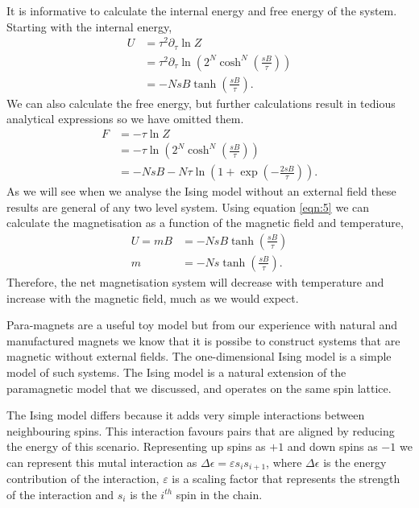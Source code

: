 \documentclass[a4paper, twocolumn]{article}
\begin{document}
It is informative to calculate the internal energy and free %
energy of the system. Starting with the internal energy,
%
\begin{align}
U &= \tau^{2}\partial_{\tau}\ln Z\nonumber\\
    &= \tau^{2}\partial_{\tau}\ln\left(2^{N}\cosh^{N}
        \left(\frac{sB}{\tau}\right)\right)\nonumber\\
    &= -NsB\tanh\left(\frac{sB}{\tau}\right).
\label{eqn:5}
\end{align}
%
We can also calculate the free energy, but further calculations %
result in tedious analytical expressions so we have omitted them. %
%
\begin{align}
F &= -\tau\ln Z\nonumber\\
    &= -\tau\ln\left(2^{N}\cosh^{N}\left(\frac{sB}{\tau}
        \right)\right)\nonumber\\
    &= -NsB - N\tau\ln\left(1 + \exp\left(-\frac{2sB}{\tau}\right)
        \right).
\label{eqn:7}
\end{align}
%
As we will see when we analyse the Ising model without an external %
field these results are general of any two level system. Using %
equation \ref{eqn:5} we can calculate the magnetisation as a function %
of the magnetic field and temperature, 
%
\begin{align}
U = mB &= -NsB\tanh\left(\frac{sB}{\tau}\right)\nonumber\\
    m &= -Ns\tanh\left(\frac{sB}{\tau}\right).
\label{eqn:8}
\end{align}
%
Therefore, the net magnetisation system will decrease with %
temperature and increase with the magnetic field, much as we %
would expect. 


Para-magnets are a useful toy model but from our experience %
with natural and manufactured magnets we know that it is %
possibe to construct systems that are magnetic without external %
fields. The one-dimensional Ising model is a simple model of %
such systems. The Ising model is a natural extension of the %
paramagnetic model that we discussed, and operates on the same %
spin lattice. 


The Ising model differs because it adds very simple interactions %
between neighbouring spins. This interaction favours pairs that %
are aligned by reducing the energy of this scenario. Representing %
up spins as \(+1\) and down spins as \(-1\) we can represent this %
mutal interaction as \(\Delta \epsilon = \varepsilon s_{i}s_{i + 1}\), %
where \(\Delta \epsilon\) is the energy contribution of the %
interaction, \(\varepsilon\) is a scaling factor that represents %
the strength of the interaction and \(s_{i}\) is the \(i^{th}\) %
spin in the chain. 
\end{document}
